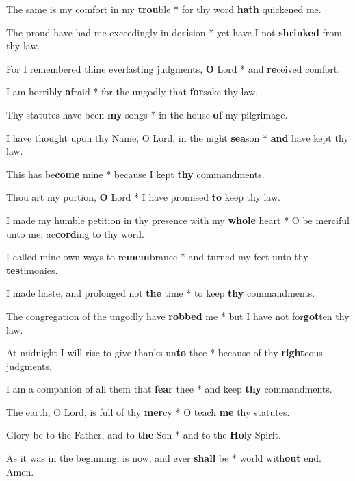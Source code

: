 \begin{multicols}{2}
	The same is my comfort in my \textbf{trou}ble * for thy word \textbf{hath} quickened me.

	The proud have had me exceedingly in de\textbf{ri}sion * yet have I not \textbf{shrinked} from thy law.
	
	For I remembered thine everlasting judgments, \textbf{O} Lord * and \textbf{re}ceived comfort.
	
	I am horribly \textbf{a}fraid * for the ungodly that \textbf{for}sake thy law.
	
	Thy statutes have been \textbf{my} songs * in the house \textbf{of} my pilgrimage.
	
	I have thought upon thy Name, O Lord, in the night \textbf{sea}son * \textbf{and} have kept thy law.
	
	This has be\textbf{come} mine * because I kept \textbf{thy} commandments.
	
	Thou art my portion, \textbf{O} Lord * I have promised \textbf{to} keep thy law.
	
	I made my humble petition in thy presence with my \textbf{whole} heart * O be merciful unto me, ac\textbf{cord}ing to thy word.
	
	I called mine own ways to re\textbf{mem}brance * and turned my feet unto thy \textbf{tes}timonies.
	
	I made haste, and prolonged not \textbf{the} time * to keep \textbf{thy} commandments.
	
	The congregation of the ungodly have \textbf{robbed} me * but I have not for\textbf{got}ten thy law.
	
	At midnight I will rise to give thanks un\textbf{to} thee * because of thy \textbf{right}eous judgments.
	
	I am a companion of all them that \textbf{fear} thee * and keep \textbf{thy} commandments.
	
	The earth, O Lord, is full of thy \textbf{mer}cy * O teach \textbf{me} thy statutes.
	
	Glory be to the Father, and to \textbf{the} Son * and to the \textbf{Ho}ly Spirit.
	
	As it was in the beginning, is now, and ever \textbf{shall} be * world with\textbf{out} end. Amen.
\end{multicols}
